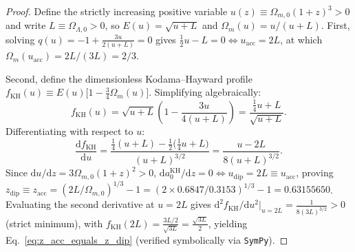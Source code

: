 \documentclass[11pt,a4paper]{article}
\theoremstyle{remark}
\begin{document}
\begin{proof}
Define the strictly increasing positive variable $u(z) \equiv \Omega_{m,0}(1+z)^3 > 0$ and write $L \equiv \Omega_{\Lambda,0} > 0$, so $E(u) = \sqrt{u + L}$ and $\Omega_m(u) = u/(u + L)$. First, solving $q(u) = -1 + \frac{3u}{2(u + L)} = 0$ gives $\frac{1}{2}u - L = 0 \iff u_{\mathrm{acc}} = 2L$, at which $\Omega_m(u_{\mathrm{acc}}) = 2L/(3L) = 2/3$.

Second, define the dimensionless Kodama--Hayward profile $f_{\mathrm{KH}}(u) \equiv E(u)\bigl[1 - \frac{3}{4}\Omega_m(u)\bigr]$. Simplifying algebraically:
\[
  f_{\mathrm{KH}}(u) = \sqrt{u + L}\left(1 - \frac{3u}{4(u + L)}\right) = \frac{\frac{1}{4}u + L}{\sqrt{u + L}}.
\]
Differentiating with respect to $u$:
\[
  \frac{\mathrm{d}f_{\mathrm{KH}}}{\mathrm{d}u} = \frac{\frac{1}{4}(u + L) - \frac{1}{2}\bigl(\frac{1}{4}u + L\bigr)}{(u + L)^{3/2}} = \frac{u - 2L}{8(u + L)^{3/2}}.
\]
Since $\mathrm{d}u/\mathrm{d}z = 3\Omega_{m,0}(1+z)^2 > 0$, $\mathrm{d}a_0^{\mathrm{KH}}/\mathrm{d}z = 0 \iff u_{\mathrm{dip}} = 2L \equiv u_{\mathrm{acc}}$, proving $z_{\mathrm{dip}} \equiv z_{\mathrm{acc}} = (2L/\Omega_{m,0})^{1/3} - 1 = (2 \times 0.6847 / 0.3153)^{1/3} - 1 = 0.63155650$. Evaluating the second derivative at $u = 2L$ gives $\mathrm{d}^2 f_{\mathrm{KH}}/\mathrm{d}u^2|_{u=2L} = \frac{1}{8(3L)^{3/2}} > 0$ (strict minimum), with $f_{\mathrm{KH}}(2L) = \frac{3L/2}{\sqrt{3L}} = \frac{\sqrt{3L}}{2}$, yielding Eq.~\eqref{eq:z_acc_equals_z_dip} (verified symbolically via \texttt{SymPy}).
\end{proof}
\end{document}
